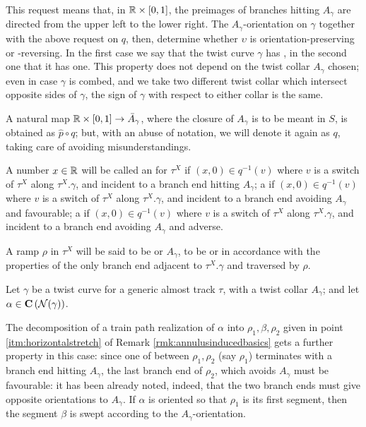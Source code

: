 \begin{rmk}
This request means that, in $\mathbb R\times[0,1]$, the preimages of branches hitting $A_\gamma$ are directed from the upper left to the lower right. The $A_\gamma$-orientation on $\gamma$ together with the above request on $q$, then, determine whether $\upsilon$ is orientation-preserving or -reversing. In the first case we say that the twist curve $\gamma$ has , in the second one that it has  one. This property does not depend on the twist collar $A_\gamma$ chosen; even in case $\gamma$ is combed, and we take two different twist collar which intersect opposite sides of $\gamma$, the sign of $\gamma$ with respect to either collar is the same.

A natural map $\mathbb R\times[0,1]\rightarrow \bar A_\gamma$, where the closure of $A_\gamma$ is to be meant in $S$, is obtained as $\hat p\circ q$; but, with an abuse of notation, we will denote it again as $q$, taking care of avoiding misunderstandings.

A number $x\in\mathbb R$ will be called an  for $\tau^X$ if $(x,0)\in q^{-1}(v)$ where $v$ is a switch of $\tau^X$ along $\tau^X.\gamma$, and incident to a branch end hitting $A_\gamma$; a  if $(x,0)\in q^{-1}(v)$ where $v$ is a switch of $\tau^X$ along $\tau^X.\gamma$, and incident to a branch end avoiding $A_\gamma$ and favourable; a  if $(x,0)\in q^{-1}(v)$ where $v$ is a switch of $\tau^X$ along $\tau^X.\gamma$, and incident to a branch end avoiding $A_\gamma$ and adverse. 

A ramp $\rho$ in $\tau^X$ will be said to be  or  $A_\gamma$, to be  or  in accordance with the properties of the only branch end adjacent to $\tau^X.\gamma$ and traversed by $\rho$.
\end{rmk}

\begin{rmk}\label{rmk:sameorientationforarcs}
Let $\gamma$ be a twist curve for a generic almost track $\tau$, with a twist collar $A_\gamma$; and let $\alpha\in\mathbf C\left({\mathcal N}(\gamma)\right)$. 

The decomposition of a train path realization of $\alpha$ into $\rho_1,\beta,\rho_2$ given in point \ref{itm:horizontalstretch} of Remark \ref{rmk:annulusinducedbasics} gets a further property in this case: since one of between $\rho_1,\rho_2$ (say $\rho_1$) terminates with a branch end hitting $A_\gamma$, the last branch end of $\rho_2$, which avoids $A_\gamma$ must be favourable: it has been already noted, indeed, that the two branch ends must give opposite orientations to $A_\gamma$. If $\alpha$ is oriented so that $\rho_1$ is its first segment, then the segment $\beta$ is swept according to the $A_\gamma$-orientation.
\end{rmk}

